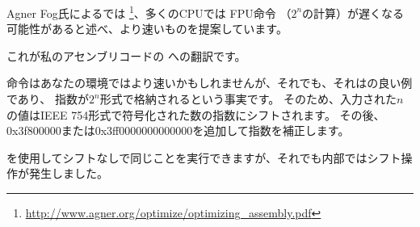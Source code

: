 ﻿

Agner Fog氏によるでは
\footnote{\url{http://www.agner.org/optimize/optimizing_assembly.pdf}}、多くのCPUでは \ac{FPU}命令
（$2^n$の計算）が遅くなる可能性があると述べ、より速いものを提案しています。

これが私のアセンブリコードの \CCpp への翻訳です。



命令はあなたの環境ではより速いかもしれませんが、それでも、それはの良い例であり、
指数が$2^n$形式で格納されるという事実です。
そのため、入力された$n$の値はIEEE 754形式で符号化された数の指数にシフトされます。
その後、0x3f800000または0x3ff0000000000000を追加して指数を補正します。

を使用してシフトなしで同じことを実行できますが、それでも内部ではシフト操作が発生しました。
